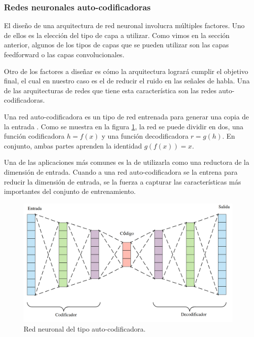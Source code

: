 \subsubsection{Redes neuronales auto-codificadoras}
\label{sec:redes_autocodificadoras}

El diseño de una arquitectura de red neuronal involucra múltiples factores. Uno de ellos es la elección del tipo de capa a utilizar. Como vimos en la sección anterior, algunos de los tipos de capas que se pueden utilizar son las capas feedforward o las capas convolucionales. 

Otro de los factores a diseñar es cómo la arquitectura logrará cumplir el objetivo final, el cual en nuestro caso es el de reducir el ruido en las señales de habla. Una de las arquitecturas de redes que tiene esta característica son las redes auto-codificadoras.

Una red auto-codificadora es un tipo de red entrenada para generar una copia de la entrada \cite{deep_learning}. Como se muestra en la figura \ref{fig:ch3_autoencoder}, la red se puede dividir en dos, una función codificadora $h=f(x)$ y una función decodificadora $r=g(h)$. En conjunto, ambas partes aprenden la identidad $g(f(x)) = x$.

Una de las aplicaciones más comunes es la de utilizarla como una reductora de la dimensión de entrada. Cuando a una red auto-codificadora se la entrena para reducir la dimensión de entrada, se la fuerza a capturar las características más importantes del conjunto de entrenamiento.

\begin{figure}
	\centering
	\centerline{\includegraphics[scale=0.2]{images/ch3/autoencoder.png}}
	\caption{Red neuronal del tipo auto-codificadora.}
	\label{fig:ch3_autoencoder}
\end{figure}

